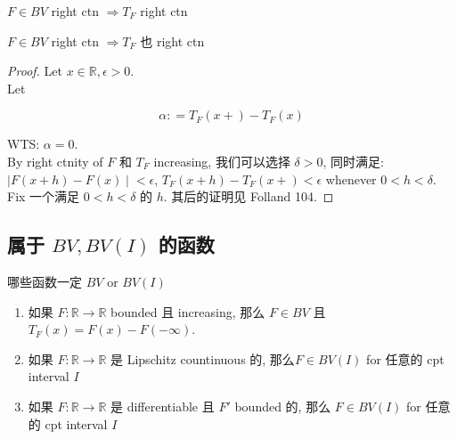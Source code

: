 \documentclass{qlnotes-export}
\begin{document}
\begin{lemma}{\(F \in BV\) right ctn \(\Longrightarrow T_{F}\) right ctn}\label{lem-12-differentiation-on-real-spaces-f-in-bv-right-ctn-implies-t-f-right-ctn}

\(F \in BV\) right ctn \(\Longrightarrow T_{F}\) 也 right ctn

\end{lemma}

\begin{proof}

Let \(x \in {\mathbb{R}},\epsilon > 0\).\\
Let

\[\alpha: = T_{F}(x + ) - T_{F}(x)\]

WTS: \(\alpha = 0\).\\
By right ctnity of \(F\) 和 \(T_{F}\) increasing, 我们可以选择 \(\delta > 0\), 同时满足: \(\left. |F(x + h) - F(x) \middle| < \epsilon \right.\), \(T_{F}(x + h) - T_{F}(x + ) < \epsilon\) whenever \(0 < h < \delta\).\\
Fix 一个满足 \(0 < h < \delta\) 的 \(h\). 其后的证明见 Folland 104.

\end{proof}

\subsection{\texorpdfstring{属于 \(BV,BV(I)\) 的函数}{属于 BV,BV(I) 的函数}}\label{ux5c5eux4e8e-bvbvi-ux7684ux51fdux6570}

\begin{lemma}{哪些函数一定 \(BV\) or \(BV(I)\)}\label{lem-12-differentiation-on-real-spaces-bv-or-bv-i}

\begin{enumerate}
\item
  如果 \(F:{\mathbb{R}}\rightarrow{\mathbb{R}}\) bounded 且 increasing, 那么 \(F \in BV\) 且 \(T_{F}(x) = F(x) - F( - \infty)\).\\
\item
  如果 \(F:{\mathbb{R}}\rightarrow{\mathbb{R}}\) 是 Lipschitz countinuous 的, 那么\(F \in BV(I)\) for 任意的 cpt interval \(I\)
\item
  如果 \(F:{\mathbb{R}}\rightarrow{\mathbb{R}}\) 是 differentiable 且 \(F'\) bounded 的, 那么 \(F \in BV(I)\) for 任意的 cpt interval \(I\)
\end{enumerate}

\end{lemma}
\end{document}
